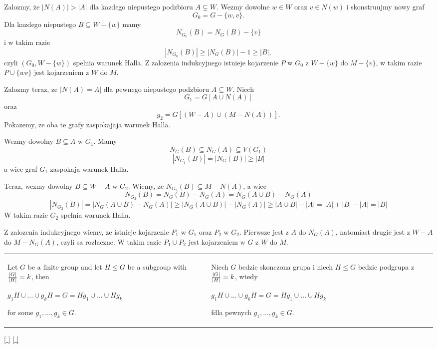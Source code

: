 Zalozmy, że $|N(A)|>|A|$ dla kazdego niepustego podzbioru $A\subsetneq W$. Wezmy dowolne $w\in W$ oraz $v\in N(w)$ i skonstruujmy nowy graf
$$G_0=G-\{w,v\}.$$
Dla kazdego niepustego $B\subseteq W-\{w\}$ mamy
$$N_{G_0}(B)=N_{G}(B)-\{v\}$$
i w takim razie
$$|N_{G_0}(B)|\geq |N_G(B)|-1\geq |B|,$$
czyli $(G_0, W-\{w\})$ spelnia warunek Halla. Z zalozenia indukcyjnego istnieje kojarzenie $P$ w $G_0$ z $W-\{w\}$ do $M-\{v\}$, w takim razie $P\cup\{wv\}$ jest kojarzeniem z $W$ do $M$.
\smallskip

Zalozmy teraz, ze $|N(A)=A|$ dla pewnego niepustego podzbioru $A\subsetneq W$. Niech
$$G_1=G[A\cup N(A)]$$ 
oraz 
$$g_2=G[(W-A)\cup(M-N(A))].$$
Pokazemy, ze oba te grafy zaspokajaja warunek Halla.

Wezmy dowolny $B\subseteq A$ w $G_1$. Mamy
$$N_G(B)\subseteq N_G(A)\subseteq V(G_1)$$
$$|N_{G_1}(B)|=|N_G(B)|\geq|B|$$
a wiec graf $G_1$ zaspokaja warunek Halla.

Teraz, wezmy dowolny $B\subseteq W-A$ w $G_2$. Wiemy, ze $N_{G_2}(B)\subseteq M-N(A)$, a wiec
$$N_{G_2}(B)= N_G(B)-N_G(A)=N_G(A\cup B)-N_G(A)$$
$$|N_{G_2}(B)|=|N_G(A\cup B)-N_G(A)|\geq |N_G(A\cup B)|-|N_G(A)|\geq |A\cup B|-|A|=|A|+|B|-|A|=|B|$$
W takim razie $G_2$ spelnia warunek Halla.
\smallskip

Z zalozenia indukcyjnego wiemy, ze istnieje kojarzenie $P_1$ w $G_1$ oraz $P_2$ w $G_2$. Pierwsze jest z $A$ do $N_G(A)$, natomiast drugie jest z $W-A$ do $M-N_G(A)$, czyli sa rozlaczne. W takim razie $P_1\cup P_2$ jest kojarzeniem w $G$ z $W$ do $M$.
\bigskip

\bigskip

\begin{tabularx}{\textwidth}{ X!{\color{git90gray}\vrule} X}

    Let $G$ be a finite group and let $H\leq G$ be a subgroup with ${|G|\over|H|}=k$, then

    $g_1H\cup ...\cup g_kH=G=Hg_1\cup...\cup Hg_k$

    for some $g_1,...,g_k\in G$.

    &

    Niech $G$ bedzie skonczona grupa i niech $H\leq G$ bedzie podgrupa z ${|G|\over|H|}=k$, wtedy


    $g_1H\cup ...\cup g_kH=G=Hg_1\cup...\cup Hg_k$
    
    fdla pewnych $g_1,...,g_k\in G$.

\end{tabularx}

\hyperref[cosets-graphs-GB]{[ ]} \hyperref[cosets-graphs-PL]{[ ]}
\label{cosets-graphs-LAN}

